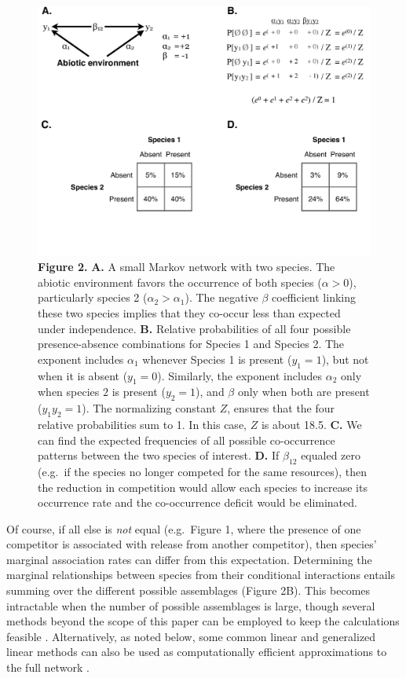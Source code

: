 \begin{figure}[htbp]
\centering
\includegraphics{figures/Figure_2.pdf}
\caption{\textbf{Figure 2.} \textbf{A.} A small Markov network with two
species. The abiotic environment favors the occurrence of both species
(\(\alpha >0\)), particularly species 2 (\(\alpha_2 > \alpha_1\)). The
negative \(\beta\) coefficient linking these two species implies that
they co-occur less than expected under independence. \textbf{B.}
Relative probabilities of all four possible presence-absence
combinations for Species 1 and Species 2. The exponent includes
\(\alpha_1\) whenever Species 1 is present (\(y_1 = 1\)), but not when
it is absent (\(y_1 = 0\)). Similarly, the exponent includes
\(\alpha_2\) only when species \(2\) is present (\(y_2 = 1\)), and
\(\beta\) only when both are present (\(y_1y_2 = 1\)). The normalizing
constant \(Z\), ensures that the four relative probabilities sum to 1.
In this case, \(Z\) is about 18.5. \textbf{C.} We can find the expected
frequencies of all possible co-occurrence patterns between the two
species of interest. \textbf{D.} If \(\beta_{12}\) equaled zero (e.g.~if
the species no longer competed for the same resources), then the
reduction in competition would allow each species to increase its
occurrence rate and the co-occurrence deficit would be eliminated.}
\end{figure}

Of course, if all else is \emph{not} equal (e.g.~Figure 1, where the
presence of one competitor is associated with release from another
competitor), then species' marginal association rates can differ from
this expectation. Determining the marginal relationships between species
from their conditional interactions entails summing over the different
possible assemblages (Figure 2B). This becomes intractable when the
number of possible assemblages is large, though several methods beyond
the scope of this paper can be employed to keep the calculations
feasible \citep{lee_learning_2012, salakhutdinov_learning_2008}.
Alternatively, as noted below, some common linear and generalized linear
methods can also be used as computationally efficient approximations to
the full network \citep{lee_learning_2012, loh_structure_2013}.


